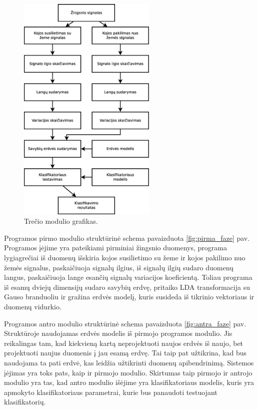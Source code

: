 \documentclass[]{vgtuef}
\begin{document}
\begin{figure}[!t]
  \centering
  \includegraphics[width=250px]{figures/trecia_faze.eps}
  \caption{Trečio modulio grafikas.}
  \label{fig:trecia_faze}
\end{figure}

Programos pirmo modulio struktūrinė schema pavaizduota \ref{fig:pirma_faze} pav. Programos įėjime yra pateikiami pirminiai žingsnio duomenys, programa lygiagrečiai iš duomenų išskiria kojos susilietimo su žeme ir kojos pakilimo nuo žemės signalus, paskaičiuoja signalų ilgius, iš signalų ilgių sudaro duomenų langus, paskaičiuoja lange esančių signalų variacijos koeficientą. Toliau programa iš esamų dviejų dimensijų sudaro savybių erdvę, pritaiko LDA transformacija su Gauso branduoliu ir gražina erdvės modelį, kuris susideda iš tikrinio vektoriaus ir duomenų vidurkio.

Programos antro modulio struktūrinė schema pavaizduota \ref{fig:antra_faze} pav. Struktūroje naudojamas erdvės modelis iš pirmojo programos modulio. Jis reikalingas tam, kad kiekvieną kartą neprojektuoti naujos erdvės iš naujo, bet projektuoti naujus duomenis į jau esamą erdvę. Tai taip pat užtikrina, kad bus naudojama ta pati erdvė, kas leidžia užtikrinti duomenų apibendrinimą. Sistemos įėjimas yra toks pats, kaip ir pirmojo modulio. Skirtumas taip pirmojo ir antrojo modulio yra tas, kad antro modulio išėjime yra klasifikatoriaus modelis, kuris yra apmokyto klasifikatoriaus parametrai, kurie bus panaudoti testuojant klasifikatorių.
\end{document}
